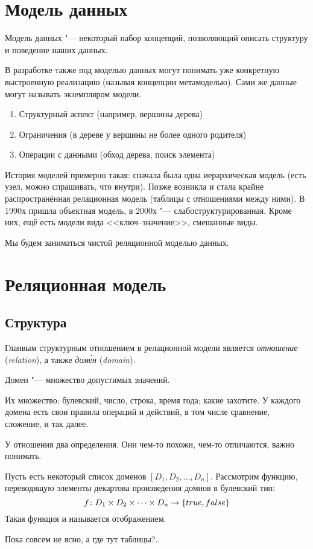 \section{Модель данных}

\begin{Def}
	Модель данных "--- некоторый набор концепций, позволяющий описать структуру и поведение наших данных.
\end{Def}
В разработке также под моделью данных могут понимать уже конкретную выстроенную реализацию (называя концепции метамоделью).
Сами же данные могут называть экземпляром модели.

\begin{enumerate}
	\item Структурный аспект (например, вершины дерева)
	\item Ограничения (в дереве у вершины не более одного родителя)
	\item Операции с данными (обход дерева, поиск элемента)
\end{enumerate}

История моделей примерно такая: сначала была одна иерархическая модель (есть узел, можно спрашивать, что внутри).
Позже возникла и стала крайне распространённая релационная модель (таблицы с отношениями между ними).
В 1990х пришла объектная модель, в 2000х "--- слабоструктурированная.
Кроме них, ещё есть модели вида <<ключ--значение>>, смешанные виды.

Мы будем заниматься чистой реляционной моделью данных.

\section{Реляционная модель}

\subsection{Структура}

Гланвым структурным отношением в релационной модели является \textit{отношение} (\textit{relation}),
а также \textit{дом\'ен} (\textit{domain}).

\begin{Def}
	Домен "--- множество допустимых значений.
\end{Def}
Их множество: булевский, число, строка, время года; какие захотите.
У каждого домена есть свои правила операций и действий, в том числе сравнение, сложение, и так далее.

У отношения два определения. Они чем-то похожи, чем-то отличаются, важно понимать.
\begin{Def}
	Пусть есть некоторый список доменов $[D_1, D_2, \dots, D_n]$.
	Рассмотрим функцию, переводящую элементы декартова произведения домнов в булевский тип:
	\[ f\colon D_1 \times D_2 \times \dots \times D_n \rightarrow \{true, false\} \]
	Такая функция и называется отображением.
\end{Def}
Пока совсем не ясно, а где тут таблицы?..

